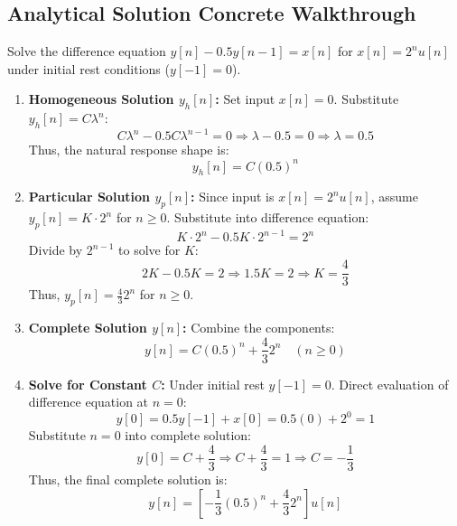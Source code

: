 \documentclass[11pt,a4paper]{article}
\begin{document}
\subsection{Analytical Solution Concrete Walkthrough}
Solve the difference equation $y[n] - 0.5 y[n-1] = x[n]$ for $x[n] = 2^n u[n]$ under initial rest conditions ($y[-1] = 0$).
\begin{enumerate}
    \item \textbf{Homogeneous Solution $y_h[n]$:} Set input $x[n] = 0$. Substitute $y_h[n] = C \lambda^n$:
    \begin{equation}
    C \lambda^n - 0.5 C \lambda^{n-1} = 0 \Rightarrow \lambda - 0.5 = 0 \Rightarrow \lambda = 0.5
    \end{equation}
    Thus, the natural response shape is:
    \begin{equation}
    y_h[n] = C (0.5)^n
    \end{equation}
    
    \item \textbf{Particular Solution $y_p[n]$:} Since input is $x[n] = 2^n u[n]$, assume $y_p[n] = K \cdot 2^n$ for $n \ge 0$. Substitute into difference equation:
    \begin{equation}
    K \cdot 2^n - 0.5 K \cdot 2^{n-1} = 2^n
    \end{equation}
    Divide by $2^{n-1}$ to solve for $K$:
    \begin{equation}
    2K - 0.5K = 2 \Rightarrow 1.5K = 2 \Rightarrow K = \frac{4}{3}
    \end{equation}
    Thus, $y_p[n] = \frac{4}{3} 2^n$ for $n \ge 0$.
    
    \item \textbf{Complete Solution $y[n]$:} Combine the components:
    \begin{equation}
    y[n] = C (0.5)^n + \frac{4}{3} 2^n \quad (n \ge 0)
    \end{equation}
    
    \item \textbf{Solve for Constant $C$:} Under initial rest $y[-1] = 0$. Direct evaluation of difference equation at $n=0$:
    \begin{equation}
    y[0] = 0.5 y[-1] + x[0] = 0.5(0) + 2^0 = 1
    \end{equation}
    Substitute $n=0$ into complete solution:
    \begin{equation}
    y[0] = C + \frac{4}{3} \Rightarrow C + \frac{4}{3} = 1 \Rightarrow C = -\frac{1}{3}
    \end{equation}
    Thus, the final complete solution is:
    \begin{equation}
    y[n] = \left[ -\frac{1}{3} (0.5)^n + \frac{4}{3} 2^n \right] u[n]
    \end{equation}
\end{enumerate}
\end{document}

